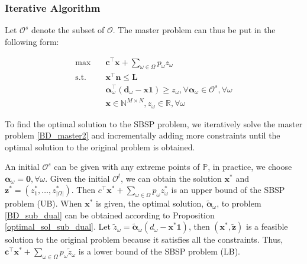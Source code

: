 
\subsubsection{Iterative Algorithm}
Let $\mathcal{O}^{s}$ denote the subset of $\mathcal{O}$. The master problem can thus be put in the following form:

\begin{equation}\label{BD_master2}
  \begin{aligned}
    \max \quad & \mathbf{c}^{\intercal} \mathbf{x} + \sum_{\omega \in \Omega} p_{\omega} z_{\omega} \\
    \text {s.t.} \quad & \mathbf{x}^{\intercal} \mathbf{n}  \leq \mathbf{L} \\
    & \bm{\alpha}_{\omega}^{\intercal}(\mathbf{d}_{\omega}- \mathbf{x} \mathbf{1}) \geq z_{\omega}, \forall \bm{\alpha}_{\omega} \in \mathcal{O}^{s}, \forall \omega \\
     & \mathbf{x} \in \mathbb{N}^{M \times N}, z_{\omega} \in \mathbb{R}, \forall \omega
  \end{aligned}
\end{equation}


To find the optimal solution to the SBSP problem, we iteratively solve the master problem \eqref{BD_master2} and incrementally adding more constraints until the optimal solution to the original problem is obtained.


An initial $\mathcal{O}^{s}$ can be given with any extreme points of $\mathbb{P}$, in practice, we choose $\bm{\alpha}_{\omega} = \mathbf{0}, \forall \omega$. Given the initial $\mathcal{O}^{t}$, we can obtain the solution $\mathbf{x}^{*}$ and $\mathbf{z}^{*} =(z^{*}_1,\ldots, z^{*}_{|\Omega|})$. Then $c^{\intercal} \mathbf{x}^{*} + \sum_{\omega \in \Omega} p_{\omega} z_{\omega}^{*}$ is an upper bound of the SBSP problem (UB). When $\mathbf{x}^{*}$ is given, the optimal solution, $\bm{\tilde{\alpha}}_{\omega}$, to problem \eqref{BD_sub_dual} can be obtained according to Proposition \ref{optimal_sol_sub_dual}. Let $\tilde{z}_{\omega} = \bm{\tilde{\alpha}}_{\omega}(d_{\omega} - \mathbf{x}^{*} \mathbf{1})$, then $(\mathbf{x}^{*}, \mathbf{\tilde{z}})$ is a feasible solution to the original problem because it satisfies all the constraints. Thus, $\mathbf{c}^{\intercal} \mathbf{x}^{*} + \sum_{\omega \in \Omega} p_{\omega} \tilde{z}_{\omega}$ is a lower bound of the SBSP problem (LB).


